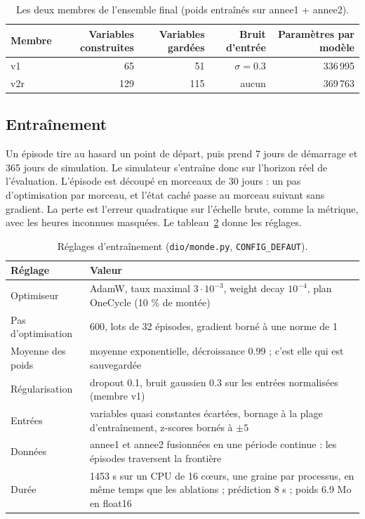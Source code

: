 \documentclass[11pt,a4paper]{article}
\newcommand{\code}[1]{\texttt{#1}}
\begin{document}
\begin{table}[!htb]
\centering\small
\caption{Les deux membres de l'ensemble final (poids entraînés sur annee1 + annee2).}
\label{tab:membres}
\begin{tabular}{l r r r r}
\toprule
Membre & Variables construites & Variables gardées & Bruit d'entrée & Paramètres par modèle \\
\midrule
v1  & 65  & 51  & $\sigma = 0.3$ & 336\,995 \\
v2r & 129 & 115 & aucun & 369\,763 \\
\bottomrule
\end{tabular}
\end{table}

\subsection{Entraînement}

Un épisode tire au hasard un point de départ, puis prend 7 jours de démarrage et 365 jours de simulation. Le simulateur s'entraîne donc sur l'horizon réel de l'évaluation. L'épisode est découpé en morceaux de 30 jours : un pas d'optimisation par morceau, et l'état caché passe au morceau suivant sans gradient. La perte est l'erreur quadratique sur l'échelle brute, comme la métrique, avec les heures inconnues masquées. Le tableau~\ref{tab:hyper} donne les réglages.

\begin{table}[!htb]
\centering\small
\caption{Réglages d'entraînement (\code{dio/monde.py}, \code{CONFIG\_DEFAUT}).}
\label{tab:hyper}
\begin{tabularx}{\linewidth}{l X}
\toprule
Réglage & Valeur \\
\midrule
Optimiseur & AdamW, taux maximal $3\cdot10^{-3}$, weight decay $10^{-4}$, plan OneCycle (10 \% de montée) \\
Pas d'optimisation & 600, lots de 32 épisodes, gradient borné à une norme de 1 \\
Moyenne des poids & moyenne exponentielle, décroissance 0.99 ; c'est elle qui est sauvegardée \\
Régularisation & dropout 0.1, bruit gaussien 0.3 sur les entrées normalisées (membre v1) \\
Entrées & variables quasi constantes écartées, bornage à la plage d'entraînement, z-scores bornés à $\pm 5$ \\
Données & annee1 et annee2 fusionnées en une période continue : les épisodes traversent la frontière \\
Durée & 1453 s sur un CPU de 16 cœurs, une graine par processus, en même temps que les ablations ; prédiction 8 s ; poids 6.9 Mo en float16 \\
\bottomrule
\end{tabularx}
\end{table}
\end{document}
